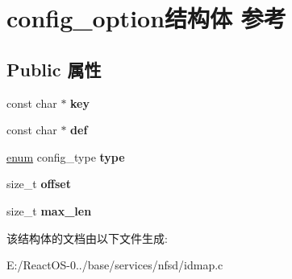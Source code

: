 \hypertarget{structconfig__option}{}\section{config\+\_\+option结构体 参考}
\label{structconfig__option}
\subsection*{Public 属性}
\begin{DoxyCompactItemize}
\item 
\mbox{\label{structconfig__option_a415920571ae254b9ba3a3660829a8f40}} 
const char $\ast$ {\bfseries key}
\item 
\mbox{\label{structconfig__option_af3b6c844aa1f7efceba758f6214aa477}} 
const char $\ast$ {\bfseries def}
\item 
\mbox{\label{structconfig__option_aa5264f0e072fbfe20e1bafb45d76419b}} 
\hyperlink{interfaceenum}{enum} config\+\_\+type {\bfseries type}
\item 
\mbox{\label{structconfig__option_a0f3378bef77d155b4a7b7765b333e9d6}} 
size\+\_\+t {\bfseries offset}
\item 
\mbox{\label{structconfig__option_ab15da0157644b31a0bab35a61c68bb29}} 
size\+\_\+t {\bfseries max\+\_\+len}
\end{DoxyCompactItemize}


该结构体的文档由以下文件生成\+:\begin{DoxyCompactItemize}
\item 
E\+:/\+React\+O\+S-\/0../base/services/nfsd/idmap.\+c\end{DoxyCompactItemize}

